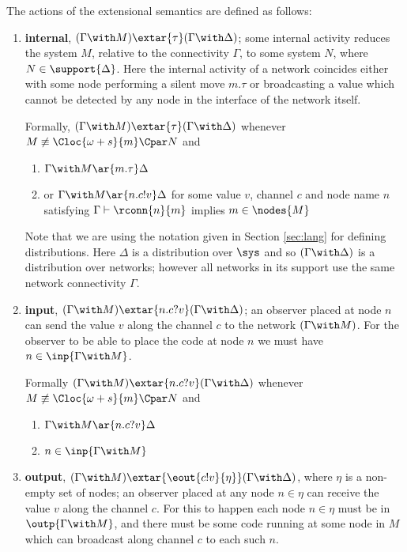\documentclass{LMCS}
\begin{document}
\begin{defi}\label{def:sea}   The actions of the extensional semantics are defined as follows:
\begin{enumerate}

\item \textbf{internal}, $(\Gamma \with M ) \extar{\tau} (\Gamma \with \Delta)$; some internal activity reduces the system
$M$, relative to the connectivity $\Gamma$, to some system $N$, where $N \in \support{\Delta}$. Here the internal 
activity of a network coincides either with some node performing a silent move $m.\tau$ or broadcasting a value 
which cannot be detected by any node in the interface of the network itself. 

Formally, $(\Gamma \with M ) \extar{\tau} (\Gamma \with \Delta)$ whenever $M \not\equiv \Cloc{\omega + s}{m} 
\Cpar N$ and 
\begin{enumerate}\item $\Gamma \with M  \ar{m.\tau} \Delta$
\item or $\Gamma \with M  \ar{n.c!v} \Delta$ for some value $v$, channel $c$ and node name $n$
satisfying $\Gamma \vdash \rconn{n}{m}$ implies $m \in \nodes{M}$
 \end{enumerate}

\noindent Note that  we are using the notation given in Section \ref{sec:lang}
for defining distributions.  Here $\Delta$ is a distribution over
$\sys$ and so $(\Gamma \with \Delta)$ is a distribution over
networks; however all networks in its support use the same network connectivity
$\Gamma$.

\item \textbf{input}, $(\Gamma \with M) \extar{n.c?v} (\Gamma \with \Delta)$; an observer
  placed at node $n$ can send the value $v$ along the channel $c$ to the network
$(\Gamma \with M)$. For the observer to be able to place the code at node $n$ we must have
$n \in \inp{\Gamma \with M}$. 

Formally $(\Gamma \with M) \extar{n.c?v} (\Gamma \with \Delta)$ whenever 
$M \not\equiv \Cloc{\omega + s}{m} \Cpar N$ and 
 \begin{enumerate}\item 
$\Gamma \with M  \ar{n.c?v} \Delta$
 \item $n \in \inp{\Gamma \with M}$
\end{enumerate}

\item \textbf{output}, $(\Gamma \with M) \extar{\eout{c!v}{\eta}} (\Gamma \with
    \Delta)$, where $\eta$ is a non-empty set of nodes; an observer
    placed at any node $n \in \eta$ can receive the value $v$ along the
    channel $c$.  For this to happen each node $n \in \eta$ must be in
    $\outp{\Gamma \with M}$, and there must be some code running at
    some node in $M$ which can broadcast along channel $c$ to each
    such $n$.


\end{enumerate}
\end{defi}
\end{document}

